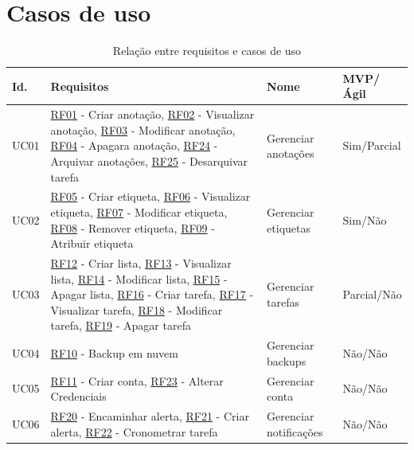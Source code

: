 \documentclass[
	12pt,				%
	oneside,			%
	a4paper,			%
	english,			%
	brazil,				%
	]{abntex2}
\begin{document}
\section{Casos de uso}

\IBGEtabfontsize
\begin{longtable}{@{}lp{}ll@{}}
\caption{Relação entre requisitos e casos de uso}
\label{tab:requisitos_x_casos_de_uso} \\
\toprule
\textbf{Id.} & \textbf{Requisitos} & \textbf{Nome} &\textbf{MVP/Ágil}\\ \midrule
UC01 & \hyperref[RF01]{RF01} - Criar anotação, \hyperref[RF02]{RF02} - Visualizar anotação, \hyperref[RF03]{RF03} - Modificar anotação, \hyperref[RF04]{RF04} - Apagara anotação, \hyperref[RF24]{RF24} - Arquivar anotações, \hyperref[RF25]{RF25} - Desarquivar tarefa & Gerenciar anotações & Sim/Parcial \\ \midrule
UC02 & \hyperref[RF05]{RF05} - Criar etiqueta, \hyperref[RF06]{RF06} - Visualizar etiqueta, \hyperref[RF07]{RF07} - Modificar etiqueta, \hyperref[RF08]{RF08} - Remover etiqueta, \hyperref[RF09]{RF09} - Atribuir etiqueta & Gerenciar etiquetas & Sim/Não \\ \midrule
UC03 & \hyperref[RF12]{RF12} - Criar lista, \hyperref[RF13]{RF13} - Visualizar lista, \hyperref[RF14]{RF14} - Modificar lista, \hyperref[RF15]{RF15} - Apagar lista, \hyperref[RF16]{RF16} - Criar tarefa, \hyperref[RF17]{RF17} - Visualizar tarefa, \hyperref[RF18]{RF18} - Modificar tarefa, \hyperref[RF19]{RF19} - Apagar tarefa & Gerenciar tarefas & Parcial/Não\\ \midrule
UC04 & \hyperref[RF10]{RF10} - Backup em nuvem & Gerenciar backups & Não/Não\\ \midrule
UC05 & \hyperref[RF11]{RF11} - Criar conta, \hyperref[RF23]{RF23} - Alterar Credenciais & Gerenciar conta & Não/Não\\ \midrule
UC06 & \hyperref[RF20]{RF20} - Encaminhar alerta, \hyperref[RF21]{RF21} - Criar alerta, \hyperref[RF22]{RF22} - Cronometrar tarefa & Gerenciar notificações & Não/Não\\ \bottomrule
\end{longtable}
\end{document}
